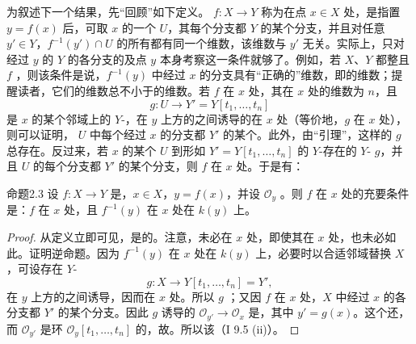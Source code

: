 为叙述下一个结果，先“回顾”如下定义。 $f:X\to Y$ 称为在点 $x\in X$ 处，是指置 $y=f(x)$ 后，可取 $x$ 的一个 $U$，其每个分支都 $Y$ 的某个分支，并且对任意 $y'\in Y$，$f^{-1}(y')\cap U$ 的所有都有同一个维数，该维数与 $y'$ 无关。实际上，只对经过 $y$ 的 $Y$ 的各分支的及点 $y$ 本身考察这一条件就够了。例如，若 $X$、$Y$ 都整且 $f$ ，则该条件是说，$f^{-1}(y)$ 中经过 $x$ 的分支具有“正确的”维数，即的维数；提醒读者，它们的维数总不小于的维数。若 $f$ 在 $x$ 处，其在 $x$ 处的维数为 $n$，且
\[
g:U\longrightarrow Y'=Y[t_1,\ldots,t_n]
\]
是 $x$ 的某个邻域上的 $Y$-，在 $y$ 上方的之间诱导的在 $x$ 处（等价地，$g$ 在 $x$ 处），则可以证明，
$U$ 中每个经过 $x$ 的分支都 $Y'$ 的某个。此外，由“引理”，这样的 $g$ 总存在。反过来，若 $x$ 的某个 $U$ 到形如 $Y'=Y[t_1,\ldots,t_n]$ 的 $Y$-存在的 $Y$- $g$，并且 $U$ 的每个分支都 $Y'$ 的某个分支，则 $f$ 在 $x$ 处。于是有：

\begin{SGAresult}{命题}{2.3}
设 $f:X\to Y$ 是，$x\in X$，$y=f(x)$，并设 $\mathcal O_y$ 。则 $f$ 在 $x$ 处的充要条件是：$f$ 在 $x$ 处，且 $f^{-1}(y)$ 在 $x$ 处在 $k(y)$ 上。
\end{SGAresult}
\begin{proof}
从定义立即可见，是的。注意，未必在 $x$ 处，即使其在 $x$ 处，也未必如此。证明逆命题。因为 $f^{-1}(y)$ 在 $x$ 处在 $k(y)$ 上，必要时以合适邻域替换 $X$，可设存在 $Y$-
\[
g:X\longrightarrow Y[t_1,\ldots,t_n]=Y',
\]
在 $y$ 上方的之间诱导，因而在 $x$ 处。所以 $g$ ；又因 $f$ 在 $x$ 处，$X$ 中经过 $x$ 的各分支都 $Y'$ 的某个分支。因此 $g$ 诱导的 $\mathcal O_{y'}\to\mathcal O_x$ 是，其中 $y'=g(x)$。这个还，而 $\mathcal O_{y'}$ 是环 $\mathcal O_y[t_1,\ldots,t_n]$ 的，故。所以该（I 9.5 (ii)）。
\end{proof}

